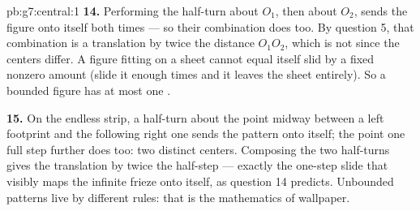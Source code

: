 \begin{solution}{pb:g7:central:1}
\textbf{14.} Performing the half-turn about $O_1$, then about
$O_2$, sends the figure onto itself both times --- so their
combination does too. By question 5, that combination is a
translation by twice the distance $O_1 O_2$, which is not 
since the centers differ. A figure fitting on a sheet cannot
equal itself slid by a fixed nonzero amount (slide it enough
times and it leaves the sheet entirely). So a bounded figure has
at most one .

\textbf{15.} On the endless strip, a half-turn about the point
midway between a left footprint and the following right one
sends the pattern onto itself; the point one full step further
does too: two distinct centers. Composing the two half-turns
gives the translation by twice the half-step --- exactly the
one-step slide that visibly maps the infinite frieze onto
itself, as question 14 predicts. Unbounded patterns live by
different rules: that is the mathematics of wallpaper.
\end{solution}
